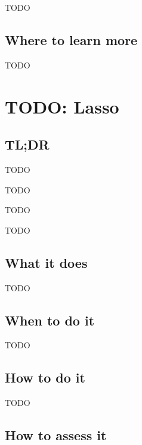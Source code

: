 \documentclass[
]{book}
\providecommand{\tightlist}{%
  \setlength{\itemsep}{0pt}\setlength{\parskip}{0pt}}
\begin{document}
TODO

\hypertarget{where-to-learn-more-13}{%
\section{Where to learn more}\label{where-to-learn-more-13}}

TODO

\hypertarget{lasso}{%
\chapter{TODO: Lasso}\label{lasso}}

\hypertarget{tldr-14}{%
\section{TL;DR}\label{tldr-14}}

\begin{description}
\tightlist
\item[What it does]
TODO
\item[When to do it]
TODO
\item[How to do it]
TODO
\item[How to assess it]
TODO
\end{description}

\hypertarget{what-it-does-14}{%
\section{What it does}\label{what-it-does-14}}

TODO

\hypertarget{when-to-do-it-14}{%
\section{When to do it}\label{when-to-do-it-14}}

TODO

\hypertarget{how-to-do-it-14}{%
\section{How to do it}\label{how-to-do-it-14}}

TODO

\hypertarget{how-to-assess-it-14}{%
\section{How to assess it}\label{how-to-assess-it-14}}
\end{document}
